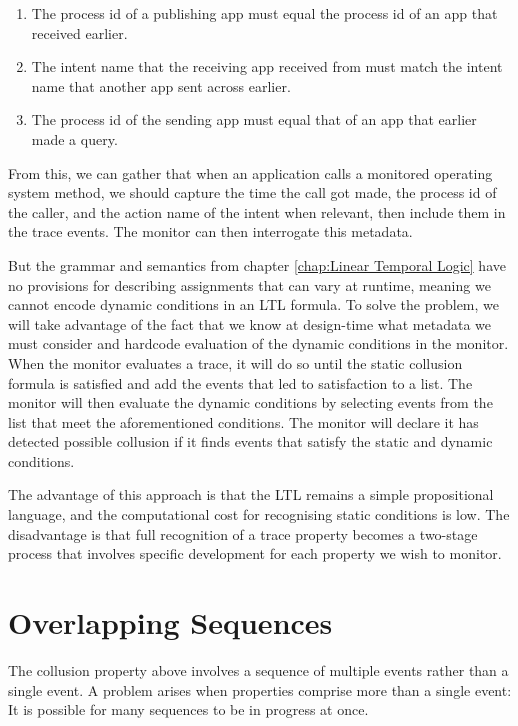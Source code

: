 \begin{enumerate}
\item The process id of a publishing app must equal the process id of an app that received earlier.  
\item The intent name that the receiving app received from must match the intent name that another app sent across earlier.
\item The process id of the sending app must equal that of an app that earlier made a query.  
\end{enumerate}

From this, we can gather that when an application calls a monitored operating system method, we should capture the time the call got made, the process id of the caller, and the action name of the intent when relevant, then include them in the trace events. The monitor can then interrogate this metadata.

But the grammar and semantics from chapter \ref{chap:Linear Temporal Logic} have no provisions for describing assignments that can vary at runtime, meaning we cannot encode dynamic conditions in an LTL formula.  To solve the problem, we will take advantage of the fact that we know at design-time what metadata we must consider and hardcode evaluation of the dynamic conditions in the monitor.  When the monitor evaluates a trace, it will do so until the static collusion formula is satisfied and add the events that led to satisfaction to a list. The monitor will then evaluate the dynamic conditions by selecting events from the list that meet the aforementioned conditions.  The monitor will declare it has detected possible collusion if it finds events that satisfy the static and dynamic conditions.

The advantage of this approach is that the LTL remains a simple propositional language, and the computational cost for recognising static conditions is low. The disadvantage is that full recognition of a trace property becomes a two-stage process that involves specific development for each property we wish to monitor.

\section{Overlapping Sequences}

The collusion property above involves a sequence of multiple events rather than a single event.  A problem arises when properties comprise more than a single event:  It is possible for many sequences to be in progress at once.  

